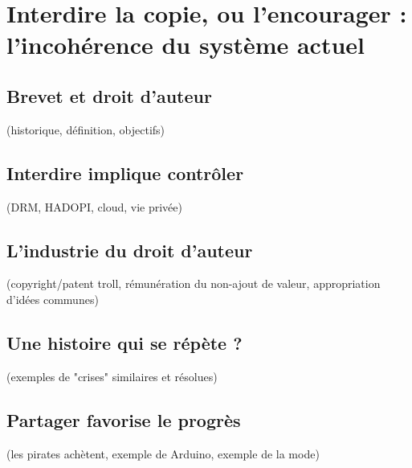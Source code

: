 \chapter{Interdire la copie, ou l'encourager : l'incohérence du système actuel}

\section{Brevet et droit d'auteur}
(historique, définition, objectifs)
\section{Interdire implique contrôler} %
(DRM, HADOPI, cloud, vie privée)
\section{L'industrie du droit d'auteur}
(copyright/patent troll, rémunération du non-ajout de valeur, appropriation d'idées communes)
\section{Une histoire qui se répète ?}
(exemples de "crises" similaires et résolues)
\section{Partager favorise le progrès}
(les pirates achètent, exemple de Arduino, exemple de la mode)
